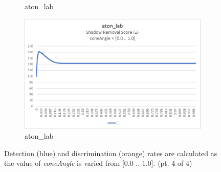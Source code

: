 \begin{appendices}
\begin{figure}
\begin{subfigure}{.45\linewidth}
  \caption{aton\_lab}
\end{subfigure}
\hfill
\begin{subfigure}{.45\linewidth}
  \includegraphics[width=1\linewidth]{figures/appendix/lab_coneAngle_score.jpg}
  \caption{aton\_lab}
\end{subfigure}

\caption{Detection (blue) and discrimination (orange) rates are calculated as the value of \textit{coneAngle} is varied from [0.0 .. 1.0]. (pt. 4 of 4)}
\end{figure}


\end{appendices}
